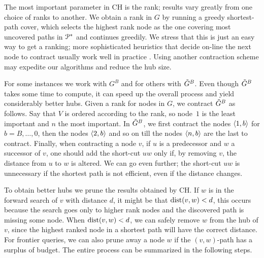 The most important parameter in CH is the rank; results vary greatly from one choice of ranks to another.
We obtain a rank in $G$ by running a greedy shortest-path cover, which selects the highest rank node as the one covering most uncovered paths in $\mathcal{P}^*$ and continues greedily.
We stress that this is just an easy way to get a ranking; more sophisticated heuristics that decide on-line the next node to contract usually work well in practice \cite{goldberg_survey,rice_csp}.
Using another contraction scheme may expedite our algorithms and reduce the hub size.

For some instances we work with $G^B$ and for others with $\tilde G^B$.
Even though $\tilde G^B$ takes some time to compute, it can speed up the overall process and yield considerably better hubs. 
Given a rank for nodes in $G$, we contract $\tilde G^B$ as follows.
Say that $V$ is ordered according to the rank, so node~$1$ is the least important and $n$ the most important.
In $\tilde G^B$, we first contract the nodes $\langle1,b\rangle$ for $b=B,\ldots,0$, then the nodes $\langle2,b\rangle$ and so on till the nodes $\langle n,b\rangle$ are the last to contract. 
Finally, when contracting a node $v$, if $u$ is a predecessor and $w$ a successor of $v$, one should add the short-cut $uw$ only if, by removing $v$, the distance from $u$ to $w$ is altered.
We can go even further; the short-cut $uw$ is unnecessary if the shortest path is not efficient, even if the distance changes.

To obtain better hubs we prune the results obtained by CH.
If $w$ is in the forward search of $v$ with distance $d$, it might be that $\mbox{dist}(v,w)<d$, this occurs because the search goes only to higher rank nodes and the discovered path is missing some node.
When $\mbox{dist}(v,w)<d$, we can safely remove $w$ from the hub of $v$, since the highest ranked node in a shortest path will have the correct distance.
For frontier queries, we can also prune away a node $w$ if the $(v,w)$-path has a surplus of budget.
The entire process can be summarized in the following steps.

